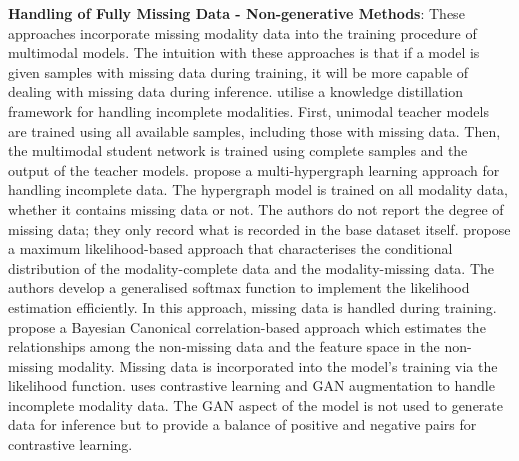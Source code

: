 \textbf{Handling of Fully Missing Data - Non-generative Methods}: These approaches incorporate missing modality data into the training procedure of multimodal models. The intuition with these approaches is that if a model is given samples with missing data during training, it will be more capable of dealing with missing data during inference. \citet{10.1145/3394486.3403234} utilise a knowledge distillation framework for handling incomplete modalities. First, unimodal teacher models are trained using all available samples, including those with missing data. Then, the multimodal student network is trained using complete samples and the output of the teacher models. \citet{7993002}  propose a multi-hypergraph learning approach for handling incomplete data. The hypergraph model is trained on all modality data, whether it contains missing data or not. The authors do not report the degree of missing data; they only record what is recorded in the base dataset itself. \citet{ma2021maximum} propose a maximum likelihood-based approach that characterises the conditional distribution of the modality-complete data and the modality-missing data. The authors develop a generalised softmax function to implement the likelihood estimation efficiently. In this approach, missing data is handled during training. \citet{Matsuura_2018_ECCV_Workshops} propose a Bayesian Canonical correlation-based approach which estimates the relationships among the non-missing data and the feature space in the non-missing modality. Missing data is incorporated into the model's training via the likelihood function. \citet{QIAN2023443} uses contrastive learning and GAN augmentation to handle incomplete modality data. The GAN aspect of the model is not used to generate data for inference but to provide a balance of positive and negative pairs for contrastive learning. 

